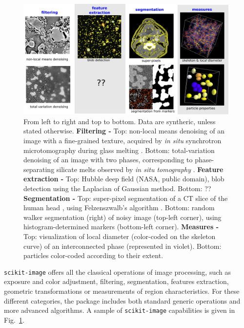 \documentclass[twocolumn]{bmcart}%
\begin{document}
\begin{figure}
    \centerline{\includegraphics[width=0.99\textwidth]{tomo_gallery}}
    \caption{ From left to right and top to bottom.
	Data are syntheric, unless stated otherwise.
	\textbf{Filtering -} Top: non-local means denoising of an image
	with a fine-grained texture, acquired by \emph{in situ}
	synchrotron microtomography during
	glass melting \citep{Gouillart2012}. Bottom: total-variation
	denoising of an image with two phases, corresponding to
	phase-separating silicate melts observed by \emph{in situ
	tomography} \citep{Bouttes2015}.
	\textbf{Feature extraction -} Top: Hubble deep field (NASA,
	public domain), blob detection using the
	Laplacian of Gaussian method. Bottom: ??
	\textbf{Segmentation - } Top: super-pixel segmentation
	of a CT slice of the human head \citep{tomo_wikipedia}, using
	Felzenszwalb's algorithm \citep{Felzenszwalb2004}. Bottom: random
	walker segmentation (right) of noisy image (top-left corner), using
	histogram-determined markers (bottom-left corner).
	\textbf{Measures -} Top: visualization of local diameter
	(color-coded on the skeleton curve) of an
	interconnected phase (represented in violet).  Bottom: particles color-coded according
	to their extent.
\label{fig:tomo_gallery}}
\end{figure}

\texttt{scikit-image} offers all the classical operations of image
processing, such as exposure and color adjustment, filtering,
segmentation, features extraction, geometric transformations or
measurements of region characteristics. For these
different categories, the package includes both standard generic
operations and more advanced algorithms. A sample of
\texttt{scikit-image} capabilities is given in
Fig.~\ref{fig:tomo_gallery}.  
\end{document}
